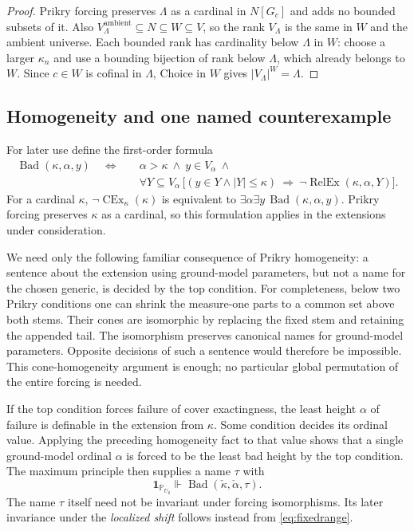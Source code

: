 \documentclass[11pt,letterpaper]{article}
\theoremstyle{definition}
\newcommand{\CEx}{\operatorname{CEx}}
\newcommand{\RelEx}{\operatorname{RelEx}}
\newcommand{\Bad}{\operatorname{Bad}}
\newcommand{\forces}{\Vdash}
\newcommand{\PP}{\mathbb P}
\begin{document}
\begin{proof}
Prikry forcing preserves $\Lambda$ as a cardinal in $N[G_c]$ and adds
no bounded subsets of it. Also $V_\Lambda^{\mathrm{ambient}}\subseteq N
\subseteq W\subseteq V$, so the rank $V_\Lambda$ is the same in $W$
and the ambient universe. Each bounded rank has cardinality below
$\Lambda$ in $W$: choose a larger $\kappa_n$ and use a bounding
bijection of rank below $\Lambda$, which already belongs to $W$.
Since $c\in W$ is cofinal in $\Lambda$, Choice in $W$ gives
$|V_\Lambda|^W=\Lambda$.
\end{proof}

\subsection{Homogeneity and one named counterexample}

For later use define the first-order formula
\begin{equation}\label{eq:bad}
\begin{split}
 \Bad(\kappa,\alpha,y)\quad\Longleftrightarrow\quad
 &\alpha>\kappa\ \wedge\ y\in V_\alpha\ \wedge\
 \\[-2pt]
 &\forall Y\subseteq V_\alpha\,
 \bigl[(y\in Y\wedge |Y|\leq\kappa)
               \ \Longrightarrow\ \neg\RelEx(\kappa,\alpha,Y)\bigr].
\end{split}
\end{equation}
For a cardinal $\kappa$, $\neg\CEx_\kappa(\kappa)$ is equivalent to
$\exists\alpha\exists y\,\Bad(\kappa,\alpha,y)$.
Prikry forcing preserves $\kappa$ as a cardinal, so this formulation
applies in the extensions under consideration.

We need only the following familiar consequence of Prikry homogeneity:
a sentence about the extension using ground-model parameters, but not a
name for the chosen generic, is decided by the top condition.
For completeness, below two Prikry conditions one can shrink the
measure-one parts to a common set above both stems. Their cones are
isomorphic by replacing the fixed stem and retaining the appended tail.
The isomorphism preserves canonical names for ground-model parameters.
Opposite decisions of such a sentence would therefore be impossible.
This cone-homogeneity argument is enough; no particular global
permutation of the entire forcing is needed.

If the top condition forces failure of cover exactingness, the least
height $\alpha$ of failure is definable in the extension from $\kappa$.
Some condition decides its ordinal value. Applying the preceding
homogeneity fact to that value shows that a single ground-model ordinal
$\alpha$ is forced to be the least bad height by the top condition.
The maximum principle then supplies a name $\tau$ with
\begin{equation}\label{eq:badforced}
 \mathbf 1_{\PP_{U_0}}\forces\Bad(\check\kappa,\check\alpha,\tau).
\end{equation}
The name $\tau$ itself need not be invariant under forcing isomorphisms.
Its later invariance under the \emph{localized shift} follows instead
from \eqref{eq:fixedrange}.
\end{document}

